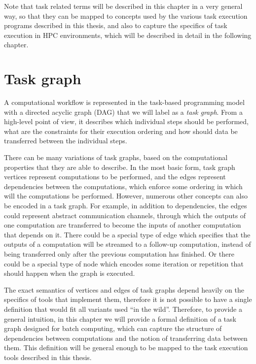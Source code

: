 Note that task related terms will be described in this chapter in a very general way, so that they
can be mapped to concepts used by the various task execution programs described in this thesis, and
also to capture the specifics of task execution in HPC environments, which will be described in
detail in the following chapter. %

\section{Task graph}
A computational workflow is represented in the task-based programming model with a directed acyclic
graph (DAG) that we will label as a \emph{task graph}. From a high-level point of view, it
describes which individual steps should be performed, what are the constraints for their execution
ordering and how should data be transferred between the individual steps.

There can be many variations of task graphs, based on the computational properties that they are
able to describe. In the most basic form, task graph vertices represent computations to be
performed, and the edges represent dependencies between the computations, which enforce some
ordering in which will the computations be performed. However, numerous other concepts can also be
encoded in a task graph. For example, in addition to dependencies, the edges could represent
abstract communication channels, through which the outputs of one computation are transferred to
become the inputs of another computation that depends on it. There could be a special type of edge
which specifies that the outputs of a computation will be streamed to a follow-up computation,
instead of being transferred only after the previous computation has finished. Or there could be a
special type of node which encodes some iteration or repetition that should happen when the graph
is executed.

The exact semantics of vertices and edges of task graphs depend heavily on the specifics of tools
that implement them, therefore it is not possible to have a single definition that would fit all
variants used ``in the wild''. Therefore, to provide a general intuition, in this chapter we will
provide a formal definition of a task graph designed for batch computing, which can capture the
structure of dependencies between computations and the notion of transferring data between them.
This definition will be general enough to be mapped to the task execution tools described in this
thesis.

